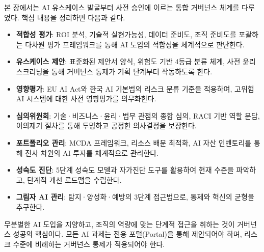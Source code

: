 본 장에서는 AI 유스케이스 발굴부터 사전 승인에 이르는 통합 거버넌스 체계를 다루었다. 핵심 내용을 정리하면 다음과 같다.

\begin{itemize}
    \item \textbf{적합성 평가}: ROI 분석, 기술적 실현가능성, 데이터 준비도, 조직 준비도를 포괄하는 다차원 평가 프레임워크를 통해 AI 도입의 적합성을 체계적으로 판단한다.

    \item \textbf{유스케이스 제안}: 표준화된 제안서 양식, 위험도 기반 4등급 분류 체계, 사전 윤리 스크리닝을 통해 거버넌스 통제가 기획 단계부터 작동하도록 한다.

    \item \textbf{영향평가}: EU AI Act와 한국 AI 기본법의 리스크 분류 기준을 적용하여, 고위험 AI 시스템에 대한 사전 영향평가를 의무화한다.

    \item \textbf{심의위원회}: 기술·비즈니스·윤리·법무 관점의 종합 심의, RACI 기반 역할 분담, 이의제기 절차를 통해 투명하고 공정한 의사결정을 보장한다.

    \item \textbf{포트폴리오 관리}: MCDA 프레임워크, 리소스 배분 최적화, AI 자산 인벤토리를 통해 전사 차원의 AI 투자를 체계적으로 관리한다.

    \item \textbf{성숙도 진단}: 5단계 성숙도 모델과 자가진단 도구를 활용하여 현재 수준을 파악하고, 단계적 개선 로드맵을 수립한다.

    \item \textbf{그림자 AI 관리}: 탐지·양성화·예방의 3단계 접근법으로, 통제와 혁신의 균형을 추구한다.
\end{itemize}

무분별한 AI 도입을 지양하고, 조직의 역량에 맞는 단계적 접근을 취하는 것이 거버넌스 성공의 핵심이다. 모든 AI 과제는 전용 포털(Portal)을 통해 제안되어야 하며, 리스크 수준에 비례하는 거버넌스 통제가 적용되어야 한다.
